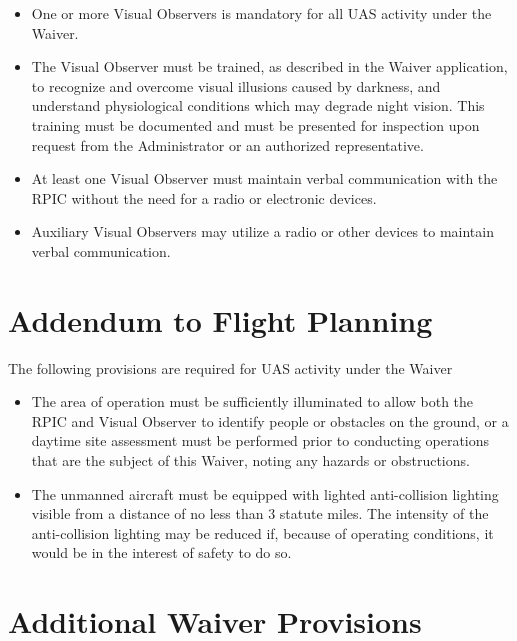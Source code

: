 \documentclass[
]{book}
\providecommand{\tightlist}{%
  \setlength{\itemsep}{0pt}\setlength{\parskip}{0pt}}
\begin{document}
\begin{itemize}
\tightlist
\item
  One or more Visual Observers is mandatory for all UAS activity under the Waiver.
\item
  The Visual Observer must be trained, as described in the Waiver application, to recognize and overcome visual illusions caused by darkness, and understand physiological conditions which may degrade night vision. This training must be documented and must be presented for inspection upon request from the Administrator or an authorized representative.
\item
  At least one Visual Observer must maintain verbal communication with the RPIC without the need for a radio or electronic devices.
\item
  Auxiliary Visual Observers may utilize a radio or other devices to maintain verbal communication.
\end{itemize}

\hypertarget{s29-fp}{%
\section{Addendum to Flight Planning}\label{s29-fp}}

The following provisions are required for UAS activity under the Waiver

\begin{itemize}
\tightlist
\item
  The area of operation must be sufficiently illuminated to allow both the RPIC and Visual Observer to identify people or obstacles on the ground, or a daytime site assessment must be performed prior to conducting operations that are the subject of this Waiver, noting any hazards or obstructions.
\item
  The unmanned aircraft must be equipped with lighted anti-collision lighting visible from a distance of no less than 3 statute miles. The intensity of the anti-collision lighting may be reduced if, because of operating conditions, it would be in the interest of safety to do so.
\end{itemize}

\hypertarget{s29-wp}{%
\section{Additional Waiver Provisions}\label{s29-wp}}
\end{document}
